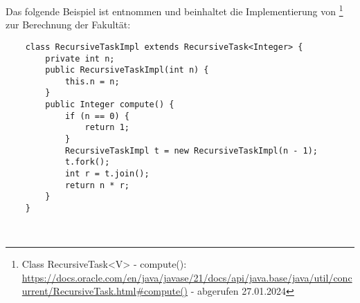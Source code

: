 \noindent
Das folgende Beispiel ist \cite[168, Listing 3.25]{Oec22} entnommen und beinhaltet die Implementierung von \footnote{
    Class RecursiveTask<V> - compute(): \url{https://docs.oracle.com/en/java/javase/21/docs/api/java.base/java/util/concurrent/RecursiveTask.html#compute()} - abgerufen 27.01.2024
} zur Berechnung der Fakultät:
\begin{verbatim}
    class RecursiveTaskImpl extends RecursiveTask<Integer> {
        private int n;
        public RecursiveTaskImpl(int n) {
            this.n = n;
        }
        public Integer compute() {
            if (n == 0) {
                return 1;
            }
            RecursiveTaskImpl t = new RecursiveTaskImpl(n - 1);
            t.fork();
            int r = t.join();
            return n * r;
        }
    }
\end{verbatim}\\